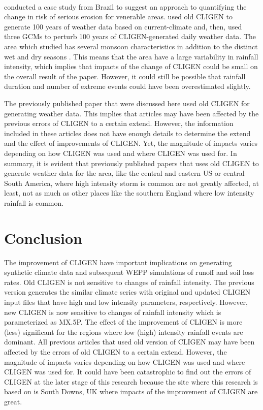 \paragraph{\citet{favis-mortlock1999-329}} conducted a case study from Brazil to
suggest an
approach to quantifying the change in risk of serious erosion for venerable
areas. \citet{favis-mortlock1999-329} used old CLIGEN to generate 100 years of
weather data based on current-climate and, then, used three GCMs to perturb 100
years of CLIGEN-generated daily weather data. The area which
\citet{favis-mortlock1999-329} studied has several monsoon characteristics in
addition to the distinct wet and dry seasons \citep{gan2004-47}. This means
that the area have a large variability in rainfall intensity, which implies
that impacts of the change of CLIGEN could be small on the overall result of the
paper. However, it could still be possible that rainfall duration and number of
extreme events could have been overestimated slightly.

The previously published paper that were discussed here used old CLIGEN for
generating weather data. This implies that articles may have been affected by
the previous errors of CLIGEN to a certain extend. However, the information
included in these articles does not have enough details to determine the extend
and the effect of improvements of CLIGEN. Yet, the magnitude of impacts varies
depending on how CLIGEN was used and where CLIGEN was used for. In summary,
it is evident that previously published papers that uses old CLIGEN to
generate weather data for the area, like the central and eastern US or central
South America, where high intensity storm is common are not greatly affected,
at least, not as much as other places like the southern England where low
intensity rainfall is common.

\section{Conclusion}
\label{sec:ImprovedCLIGENConclusion}
The improvement of CLIGEN have important implications on generating synthetic
climate data and subsequent WEPP simulations of runoff and soil loss rates. Old
CLIGEN is not sensitive to changes of rainfall intensity. The previous version
generates the similar climate series with original and updated CLIGEN input
files that have high and low intensity parameters, respectively. However, new
CLIGEN is now sensitive to changes of rainfall intensity which is parameterized
as {MX.5P}. The effect of the improvement of CLIGEN is more (less) significant
for the regions where low (high) intensity rainfall events are dominant.
All previous articles that used old version of CLIGEN may have been affected by
the errors of old CLIGEN to a certain extend. However, the magnitude of impacts
varies depending on how CLIGEN was used and where CLIGEN was used for. It could
have been catastrophic to find out the errors of CLIGEN at the later stage of
this research because the site where this research is based on is South Downs,
UK where impacts of the improvement of CLIGEN are great.


